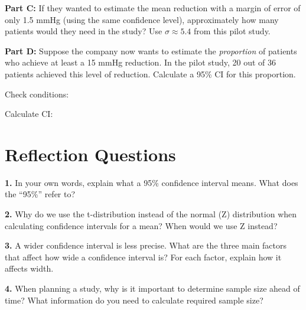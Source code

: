 \documentclass[11pt]{article}
\begin{document}
\vspace{3cm}

\textbf{Part C:} If they wanted to estimate the mean reduction with a margin of error of only 1.5 mmHg (using the same confidence level), approximately how many patients would they need in the study? Use $\sigma \approx 5.4$ from this pilot study.

\vspace{4cm}

\textbf{Part D:} Suppose the company now wants to estimate the \textit{proportion} of patients who achieve at least a 15 mmHg reduction. In the pilot study, 20 out of 36 patients achieved this level of reduction. Calculate a 95\% CI for this proportion.

\vspace{0.3cm}

Check conditions:

\vspace{1.5cm}

Calculate CI:

\vspace{4cm}

\newpage

\section*{Reflection Questions}

\textbf{1.} In your own words, explain what a 95\% confidence interval means. What does the ``95\%'' refer to?

\vspace{3cm}

\textbf{2.} Why do we use the t-distribution instead of the normal (Z) distribution when calculating confidence intervals for a mean? When would we use Z instead?

\vspace{3cm}

\textbf{3.} A wider confidence interval is less precise. What are the three main factors that affect how wide a confidence interval is? For each factor, explain how it affects width.

\vspace{4cm}

\textbf{4.} When planning a study, why is it important to determine sample size ahead of time? What information do you need to calculate required sample size?

\vspace{3cm}
\end{document}
